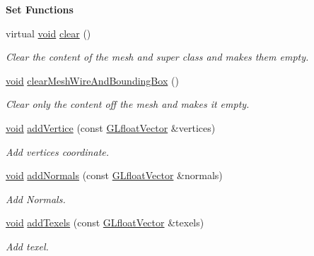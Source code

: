 \begin{Indent}{\bf Set Functions}\par
\begin{DoxyCompactItemize}
\item 
virtual \hyperlink{group___u_a_v_objects_plugin_ga444cf2ff3f0ecbe028adce838d373f5c}{void} \hyperlink{class_g_l_c___mesh_af1d3ba6f5370a1e485885cd64aa1ab61}{clear} ()
\begin{DoxyCompactList}\small\item\em Clear the content of the mesh and super class and makes them empty. \end{DoxyCompactList}\item 
\hyperlink{group___u_a_v_objects_plugin_ga444cf2ff3f0ecbe028adce838d373f5c}{void} \hyperlink{class_g_l_c___mesh_a570d68a0b5a35cd6dc7f16283c8bf150}{clear\-Mesh\-Wire\-And\-Bounding\-Box} ()
\begin{DoxyCompactList}\small\item\em Clear only the content off the mesh and makes it empty. \end{DoxyCompactList}\item 
\hyperlink{group___u_a_v_objects_plugin_ga444cf2ff3f0ecbe028adce838d373f5c}{void} \hyperlink{class_g_l_c___mesh_a429926f18098a8dc0f62310f220d54cb}{add\-Vertice} (const \hyperlink{glc__global_8h_a9f3f0b00cd127b066c9931b9c257a046}{G\-Lfloat\-Vector} \&vertices)
\begin{DoxyCompactList}\small\item\em Add vertices coordinate. \end{DoxyCompactList}\item 
\hyperlink{group___u_a_v_objects_plugin_ga444cf2ff3f0ecbe028adce838d373f5c}{void} \hyperlink{class_g_l_c___mesh_a08bb5b77607d4c51ff25904295cb16e1}{add\-Normals} (const \hyperlink{glc__global_8h_a9f3f0b00cd127b066c9931b9c257a046}{G\-Lfloat\-Vector} \&normals)
\begin{DoxyCompactList}\small\item\em Add Normals. \end{DoxyCompactList}\item 
\hyperlink{group___u_a_v_objects_plugin_ga444cf2ff3f0ecbe028adce838d373f5c}{void} \hyperlink{class_g_l_c___mesh_a5691d92a37c064e46989a4fa5316fb93}{add\-Texels} (const \hyperlink{glc__global_8h_a9f3f0b00cd127b066c9931b9c257a046}{G\-Lfloat\-Vector} \&texels)
\begin{DoxyCompactList}\small\item\em Add texel. \end{DoxyCompactList}\item 

\end{DoxyCompactItemize}
\end{Indent}
